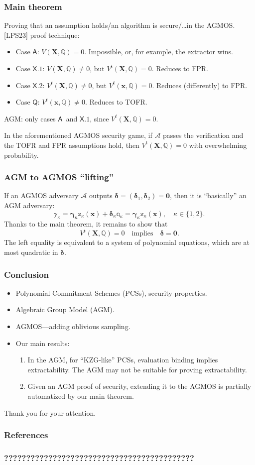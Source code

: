 \documentclass[9pt]{beamer}
\newcommand{\A}{\mathcal A}  %
\newcommand{\caseA}{\ensuremath{\mathsf{A}}}
\newcommand{\caseQ}{\ensuremath{\mathsf{Q}}}
\newcommand{\caseXone}{\ensuremath{\mathsf{X.1}}}
\newcommand{\caseXtwo}{\ensuremath{\mathsf{X.2}}}
\begin{document}
\begin{frame}
\frametitle{Main theorem}
Proving that an assumption holds/an algorithm is secure/\dots in the AGMOS. [LPS23] proof technique:
\begin{itemize}
    \item Case \caseA: $ V(\bm X, \mathbb Q) = 0 $. Impossible, or, for example, the extractor wins.
    \item Case \caseXone: $ V(\bm X, \mathbb Q) \neq 0 $, but $ V^t(\bm X, \mathbb Q) = 0 $. Reduces to FPR.
    \item Case \caseXtwo: $ V^t(\bm X, \mathbb Q) \neq 0 $, but $ V^t(\bm x, \mathbb Q) = 0 $. Reduces (differently) to FPR.
    \item Case \caseQ: $ V^t(\bm x, \mathbb Q) \neq 0 $. Reduces to TOFR.
\end{itemize}
AGM: only cases \caseA \ and \caseXone, since $ V^t(\bm X, \mathbb Q) = 0 $.
\begin{theorem}[informal]
    In the aforementioned AGMOS security game, if $ \A $ passes the verification and the TOFR and FPR assumptions hold, then $ V^t(\bm X, \mathbb Q) = 0 $ with overwhelming probability.
\end{theorem}
\end{frame}


\begin{frame}
\frametitle{AGM to AGMOS ``lifting''}
If an AGMOS adversary $ \A $ outputs $ \bm \delta = (\bm \delta_1, \bm \delta_2) = \bm 0 $, then it is ``basically'' an AGM adversary:
\[
\mathbb y_\kappa = 
\bm{\gamma}_\kappa \mathbb x_\kappa(\bm x) + \bm \delta_\kappa \mathbb q_\kappa = 
\bm{\gamma}_\kappa \mathbb x_\kappa(\bm x), \quad 
\kappa \in \{ 1, 2 \}.
\]
Thanks to the main theorem, it remains to show that
\[
V^t(\bm X, \mathbb Q) = 0 \quad \text{implies} \quad
\bm \delta = \bm 0.
\]
The left equality is equivalent to a system of polynomial equations, which are at most quadratic in $ \bm \delta $. 
\end{frame}


\begin{frame}
\frametitle{Conclusion}
\begin{itemize}
    \item Polynomial Commitment Schemes (PCSs), security properties.
    \item Algebraic Group Model (AGM).
    \item AGMOS---adding oblivious sampling.
    \item Our main results:
    \begin{enumerate}
        \item In the AGM, for ``KZG-like'' PCSs, evaluation binding implies extractability. The AGM may not be suitable for proving extractability.
        \item Given an AGM proof of security, extending it to the AGMOS is partially automatized by our main theorem.
    \end{enumerate}
\end{itemize}
\vfill
Thank you for your attention.
\end{frame}


\begin{frame}
\frametitle{References}
\end{frame}


\begin{frame}
\frametitle{???????????????????????????????????????????}
\end{frame}
\end{document}
